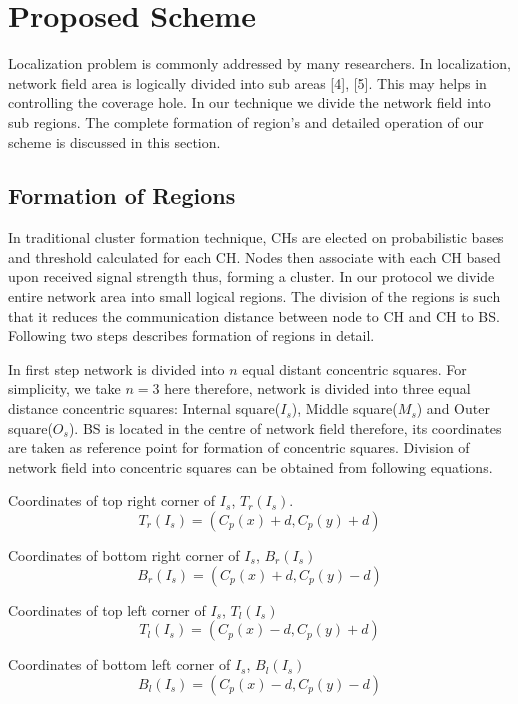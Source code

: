 \documentclass[3p,times,procedia]{elsarticle}
\begin{document}
\section {Proposed Scheme}
Localization problem is commonly addressed by many researchers. In localization, network field area is logically divided into sub areas [4], [5]. This may helps in controlling the coverage hole. In our technique we divide the network field into sub regions. The complete formation of region's and detailed operation of our scheme is discussed in this section.

\subsection{Formation of Regions }
In traditional cluster formation technique, CHs are elected on probabilistic bases and threshold calculated for each CH. Nodes then associate with each CH based upon received signal strength thus, forming a cluster. In our protocol we divide entire network area into small logical regions. The division of the regions is such that it reduces the communication distance between node to CH and CH to BS. Following two steps describes formation of regions in detail.

In first step network is divided into $n$ equal distant concentric squares. For simplicity, we take $n=3$ here therefore, network is divided into three equal distance concentric squares: Internal square($I_s$), Middle square($M_s$) and Outer square($O_s$). BS is located in the centre of network field therefore, its coordinates are taken as reference point for formation of concentric squares. Division of network field into concentric squares can be obtained from following equations.

Coordinates of top right corner of $I_s$, $T_r(I_s)$.
\begin{equation}
T_r(I_s) = (C_p (x) + d, C_p(y) + d)    \end{equation}

Coordinates of bottom right corner of $I_s$, $B_r(I_s)$
\begin{equation}
B_r(I_s) = (C_p (x) + d, C_p(y) - d)  \end{equation}

Coordinates of top left corner of $I_s$, $T_l(I_s)$
\begin{equation}
T_l(I_s) = (C_p (x) - d, C_p(y) + d)    \end{equation}

Coordinates of bottom left corner of $I_s$, $B_l(I_s)$
\begin{equation}
B_l(I_s) = (C_p (x) - d, C_p(y) - d)    \end{equation}
\end{document}
